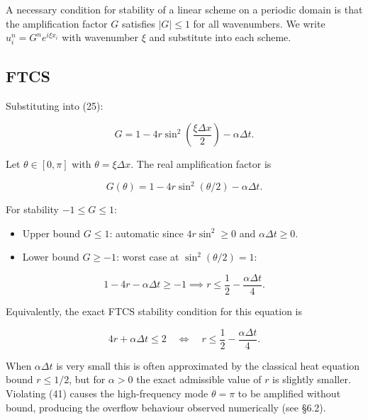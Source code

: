 \documentclass[11pt,a4paper]{article}
\begin{document}
A necessary condition for stability of a linear scheme on a periodic domain is that the amplification factor $G$ satisfies $|G| \le 1$ for all wavenumbers. We write $u_i^n = G^n e^{i\xi x_i}$ with wavenumber $\xi$ and substitute into each scheme.

\subsection{FTCS}

Substituting into (25):

\begin{equation}
G = 1 - 4r\sin^2\!\left(\frac{\xi\Delta x}{2}\right) - \alpha\Delta t. \tag{38}
\end{equation}

Let $\theta \in [0,\pi]$ with $\theta = \xi\Delta x$. The real amplification factor is

\begin{equation}
G(\theta) = 1 - 4r\sin^2(\theta/2) - \alpha\Delta t. \tag{39}
\end{equation}

For stability $-1 \le G \le 1$:

\begin{itemize}
\item Upper bound $G \le 1$: automatic since $4r\sin^2 \ge 0$ and $\alpha\Delta t \ge 0$.
\item Lower bound $G \ge -1$: worst case at $\sin^2(\theta/2) = 1$:
\end{itemize}

\begin{equation}
1 - 4r - \alpha\Delta t \ge -1 \implies r \le \frac{1}{2} - \frac{\alpha\Delta t}{4}. \tag{40}
\end{equation}

Equivalently, the exact FTCS stability condition for this equation is

\begin{equation}
{4r+\alpha\Delta t \le 2 \quad \Longleftrightarrow \quad r \le \frac{1}{2} - \frac{\alpha\Delta t}{4}.} \tag{41}
\end{equation}

When $\alpha\Delta t$ is very small this is often approximated by the classical heat equation bound $r \le 1/2$, but for $\alpha>0$ the exact admissible value of $r$ is slightly smaller. Violating (41) causes the high-frequency mode $\theta = \pi$ to be amplified without bound, producing the overflow behaviour observed numerically (see §6.2).
\end{document}

